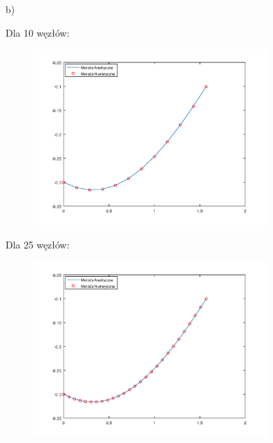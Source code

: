 \newpage
b)\\
\begin{samepage}
    Dla 10 węzłów:
    
    
    
    \FloatBarrier
    \begin{figure}[!ht]
        \begin{center}
            \includegraphics[width=0.8\textwidth]{Lab4/charts/zad2/zad2_n_10.png}
        \end{center}
    \end{figure}
    \FloatBarrier
\end{samepage}

\begin{samepage}
    Dla 25 węzłów:
    \begin{figure}[!ht]
        \begin{center}
            \includegraphics[width=0.8\textwidth]{Lab4/charts/zad2/zad2_n_25.png}
        \end{center}
    \end{figure}
    \FloatBarrier
\end{samepage}

